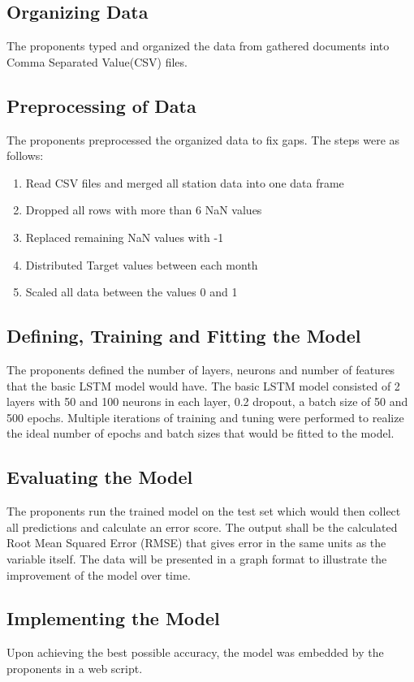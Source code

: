 \documentclass[10pt,11pt,12pt,oneside]{book}
\begin{document}
    \subsection{Organizing Data}
    The proponents typed and organized the data from gathered documents into Comma Separated Value(CSV) files.
    \subsection{Preprocessing of Data}
    The proponents preprocessed the organized data to fix gaps. The steps were as follows:
    \begin{enumerate}
        \item Read CSV files and merged all station data into one data frame
        \item Dropped all rows with more than 6 NaN values
        \item Replaced remaining NaN values with -1
        \item Distributed Target values between each month
        \item Scaled all data between the values 0 and 1
    \end{enumerate}
    \subsection{Defining, Training and Fitting the Model}
    The proponents defined the number of layers, neurons and number of features that the basic LSTM model would have. The basic LSTM model consisted of 2 layers with 50 and 100 neurons in each layer, 0.2 dropout, a batch size of 50 and 500 epochs. Multiple iterations of training and tuning were performed to realize the ideal number of epochs and batch sizes that would be fitted to the model.
    \subsection{Evaluating the Model}
    The proponents run the trained model on the test set which would then collect all predictions and calculate an error score. The output shall be the calculated Root Mean Squared Error (RMSE) that gives error in the same units as the variable itself. The data will be presented in a graph format to illustrate the improvement of the model over time.
    \subsection{Implementing the Model}
    Upon achieving the best possible accuracy, the model was embedded by the proponents in a web script.
    
\end{document}
